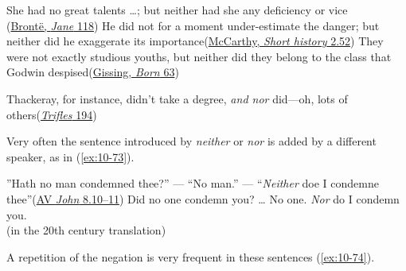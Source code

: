 \ea \label{ex:10-69}
\ea
She had no great talents {\dots}; but neither had she any deficiency or vice\\\hfill(\href{https://archive.org/details/JaneEyre-CharlotteBronte/page/n95/mode/2up?q=%22she+had+no+great+talents%22&view=theater}{Brontë, \textit{Jane} 118})
\ex
He did not for a moment under-estimate the danger; but neither did he exaggerate its importance\hfill(\href{https://books.google.co.jp/books?id=qcScwG5bgxgC&pg=PP3&dq=%22justin+mccarthy%22+%22our+own+times%22&hl=en&newbks=1&newbks_redir=0&sa=X&redir_esc=y#v=snippet&q=%22did%20not%20for%20a%20moment%22&f=false}{McCarthy, \textit{Short history} 2.52}) %
\ex
They were not exactly studious youths, but neither did they belong to the class that Godwin despised\hfill(\href{https://archive.org/details/borninexileanov02gissgoog/page/58/mode/2up?q=%22studious+youths%22&view=theater}{Gissing, \textit{Born} 63}) %
\z
\z

\ea \label{ex:10-72}
Thackeray, for instance, didn't take a degree, \emph{and nor} did---oh, lots of others\hfill(\href{https://archive.org/details/cambridgetrifle01bangoog/page/n234/mode/2up?q=Thackeray&view=theater}{\textit{Trifles} 194})
\z

Very often the sentence introduced by \textit{neither} or \textit{nor} is added by a different speaker, as in (\ref{ex:10-73}).

\ea \label{ex:10-73}
 \ea
 ''Hath no man condemned thee?'' --- ``No man.'' --- ``\emph{Neither} doe I condemne thee''\hfill(\href{https://www.kingjamesbibleonline.org/1611_John-8-10/}{AV \textit{John} 8.10--11})
 \ex Did no one condemn you? {\dots} No one. \emph{Nor} do I condemn you.\\\hfill(in the 20th century translation) %
 \z
\z

A repetition of the negation is very frequent in these sentences (\ref{ex:10-74}).

